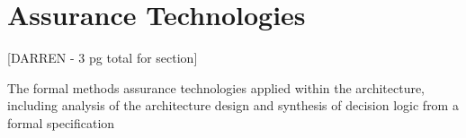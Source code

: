 \section{Assurance Technologies}

[DARREN - 3 pg total for section]

The formal methods assurance technologies applied within the architecture, 
including analysis of the architecture design and synthesis of decision logic from a formal specification

